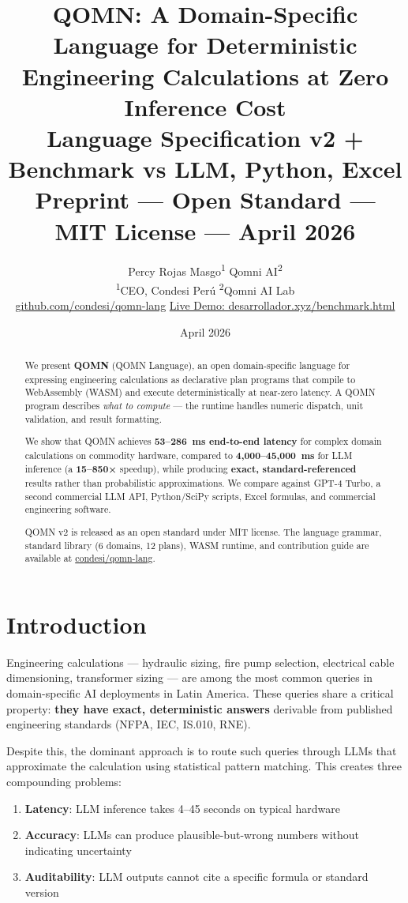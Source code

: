 \documentclass[12pt,a4paper]{article}
\title{%
  \textbf{QOMN: A Domain-Specific Language for Deterministic}\\
  \textbf{Engineering Calculations at Zero Inference Cost}\\[0.5em]
  \large Language Specification v2 + Benchmark vs LLM, Python, Excel\\[0.3em]
  \normalsize Preprint — Open Standard — MIT License — April 2026
}
\author{
  Percy Rojas Masgo\textsuperscript{1} \quad Qomni AI\textsuperscript{2}\\[0.3em]
  \textsuperscript{1}CEO, Condesi Perú \quad
  \textsuperscript{2}Qomni AI Lab\\
  \href{https://github.com/condesi/qomn-lang}{github.com/condesi/qomn-lang} \quad
  \href{https://desarrollador.xyz/benchmark.html}{Live Demo: desarrollador.xyz/benchmark.html}
}
\date{April 2026}
\begin{document}
\maketitle

\begin{abstract}
We present \textbf{QOMN} (QOMN Language), an open domain-specific language
for expressing engineering calculations as declarative plan programs that compile
to WebAssembly (WASM) and execute deterministically at near-zero latency.
A QOMN program describes \emph{what to compute} — the runtime handles numeric
dispatch, unit validation, and result formatting.

We show that QOMN achieves \textbf{53--286~ms end-to-end latency} for
complex domain calculations on commodity hardware, compared to
\textbf{4,000--45,000~ms} for LLM inference (a \textbf{15--850×} speedup),
while producing \textbf{exact, standard-referenced} results rather than
probabilistic approximations. We compare against GPT-4 Turbo, a second commercial LLM API,
Python/SciPy scripts, Excel formulas, and commercial engineering software.

QOMN v2 is released as an open standard under MIT license. The language
grammar, standard library (6 domains, 12 plans), WASM runtime, and contribution
guide are available at \href{https://github.com/condesi/qomn-lang}{condesi/qomn-lang}.
\end{abstract}

\tableofcontents
\newpage

\section{Introduction}

Engineering calculations — hydraulic sizing, fire pump selection, electrical
cable dimensioning, transformer sizing — are among the most common queries
in domain-specific AI deployments in Latin America. These queries share a
critical property: \textbf{they have exact, deterministic answers} derivable
from published engineering standards (NFPA, IEC, IS.010, RNE).

Despite this, the dominant approach is to route such queries through LLMs
that approximate the calculation using statistical pattern matching.
This creates three compounding problems:

\begin{enumerate}
  \item \textbf{Latency}: LLM inference takes 4--45 seconds on typical hardware
  \item \textbf{Accuracy}: LLMs can produce plausible-but-wrong numbers without
    indicating uncertainty
  \item \textbf{Auditability}: LLM outputs cannot cite a specific formula or
    standard version
\end{enumerate}
\end{document}
